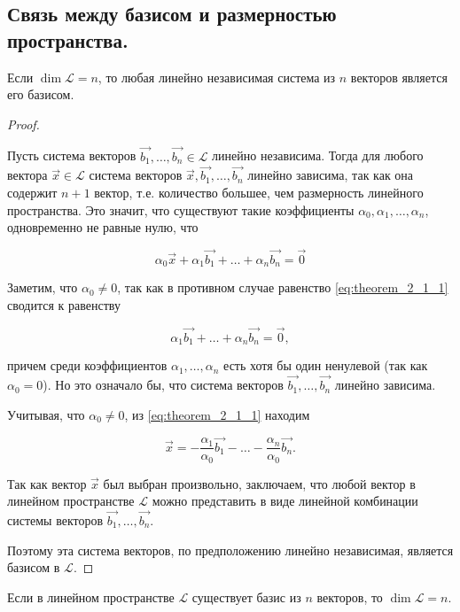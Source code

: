 \subsection{
    Связь между базисом и размерностью пространства.
}

\begin{theorem}
    Если $\dim \mathcal{L} = n$, то любая линейно независимая система из $n$ векторов является его базисом.
    \label{thm:theorem_2_1}
\end{theorem}

\begin{proof}~

    Пусть система векторов $\vec{b_1}, \ldots, \vec{b_n} \in \mathcal{L}$ линейно независима. Тогда для любого вектора $\vec{x} \in \mathcal{L}$ система векторов $\vec{x}, \vec{b_1}, \ldots, \vec{b_n}$ линейно зависима, так как она содержит $n + 1$ вектор, т.е. количество большее, чем размерность линейного пространства. Это значит, что существуют такие коэффициенты $\alpha_0, \alpha_1, \ldots, \alpha_n$, одновременно не равные нулю, что

    \begin{equation}
        \alpha_0\vec{x} + \alpha_1\vec{b_1} + \ldots + \alpha_n\vec{b_n} = \vec{0}
        \label{eq:theorem_2_1_1}
    \end{equation}

    Заметим, что $\alpha_0 \ne 0$, так как в противном случае равенство \eqref{eq:theorem_2_1_1} сводится к равенству

    \begin{equation}
        \alpha_1\vec{b_1} + \ldots + \alpha_n\vec{b_n} = \vec{0},
    \end{equation}

    причем среди коэффициентов $\alpha_1, \ldots, \alpha_n$ есть хотя бы один ненулевой (так как $\alpha_0 = 0$). Но это означало бы, что система векторов $\vec{b_1}, \ldots, \vec{b_n}$ линейно зависима. 
    
    Учитывая, что $\alpha_0 \ne 0$, из \eqref{eq:theorem_2_1_1} находим

    \begin{equation}
        \vec{x} = -\frac{\alpha_1}{\alpha_0}\vec{b_1} - \ldots - \frac{\alpha_n}{\alpha_0}\vec{b_n}.
    \end{equation}

    Так как вектор $\vec{x}$ был выбран произвольно, заключаем, что любой вектор в линейном пространстве $\mathcal{L}$ можно представить в виде линейной комбинации системы векторов $\vec{b_1}, \ldots, \vec{b_n}$.

    Поэтому эта система векторов, по предположению линейно независимая, является базисом в $\mathcal{L}$.
\end{proof}

\begin{theorem}[обратная]
    Если в линейном пространстве $\mathcal{L}$ существует базис из $n$ векторов, то $\dim \mathcal{L} = n$.
    \label{thm:theorem_2_2}
\end{theorem}